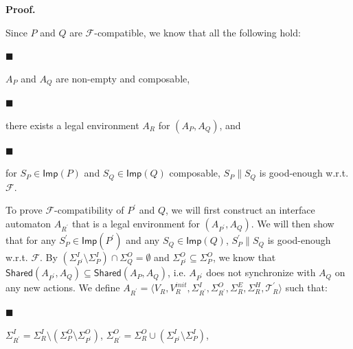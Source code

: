 \documentclass[10pt,a4paper]{article}
\begin{document}
\par\medskip\noindent\textbf{Proof.}\par
 
 
Since $P$ and $Q$ are $\mathcal{F}$-compatible, we know that all the following hold:\par
  
\par\noindent  $\blacksquare$ 
 
$A_{P}$ and $A_{Q}$ are non-empty and composable,\par
 
 
 
\par\noindent  $\blacksquare$ 
 
there exists a legal environment $A_{R}$ for $(A_{P},A_{Q})$, and\par
 
 
 
\par\noindent  $\blacksquare$ 
 
for $S_{P}\in\mathsf{Imp}(P)$ and $S_{Q}\in\mathsf{Imp}(Q)$ composable, $S_{P}\parallel S_{Q}$ is good-enough w.r.t. $\mathcal{F}$.\par
 
 
  
To prove $\mathcal{F}$-compatibility of $P^{\prime}$ and $Q$, we will first construct an interface automaton $A_{R^{\prime}}$ that is a legal environment for $(A_{P^{\prime}},A_{Q})$. We will then show that for any $S_{P}^{\prime}\in\mathsf{Imp}(P^{\prime})$ and any $S_{Q}\in\mathsf{Imp}(Q)$, $S_{P}^{\prime}\parallel S_{Q}$ is good-enough w.r.t. $\mathcal{F}$. By $(\Sigma_{P^{\prime}}^{I}\setminus\Sigma_{P}^{I})\cap\Sigma_{Q}^{O}=\emptyset$ and $\Sigma_{P^{\prime}}^{O}\subseteq\Sigma_{P}^{O}$, we know that $\mathsf{Shared}(A_{P^{\prime}},A_{Q})\subseteq\mathsf{Shared}(A_{P},A_{Q})$, i.e. $A_{P^{\prime}}$ does not synchronize with $A_{Q}$ on any new actions. We define $A_{R^{\prime}}=\langle V_{R},V_{R}^{init},\Sigma_{R^{\prime}}^{I},\Sigma_{R^{\prime}}^{O},\Sigma_{R}^{E},\Sigma_{R}^{H},\mathcal{T}^{\prime}_{R}\rangle$ such that:\par
  
\par\noindent  $\blacksquare$ 
 
$\Sigma_{R^{\prime}}^{I}=\Sigma_{R}^{I}\setminus(\Sigma_{P}^{O}\setminus\Sigma_{P^{\prime}}^{O})$, $\Sigma_{R^{\prime}}^{O}=\Sigma_{R}^{O}\cup(\Sigma_{P^{\prime}}^{I}\setminus\Sigma_{P}^{I})$,\par
 
\end{document}
